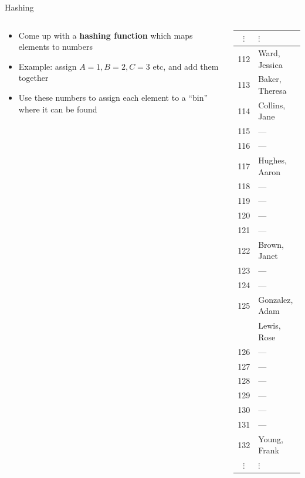 \begin{frame}{Hashing}
	\begin{columns}
		\begin{column}{0.66\textwidth}
			\begin{itemize}
				\item Come up with a \textbf{hashing function} which maps elements to numbers \pause
				\item Example: assign $A=1, B=2, C=3$ etc, and add them together \pause
				\item Use these numbers to assign each element to a ``bin'' where it can be found \pause
			\end{itemize}
		\end{column}
		\begin{column}{0.3\textwidth}
			{\tiny
			\begin{tabular}{|c|l|}
$\vdots$ & $\vdots$ \\\hline
112 & Ward, Jessica \\\hline
113 & Baker, Theresa \\\hline
114 & Collins, Jane \\\hline
115 & --- \\\hline
116 & --- \\\hline
117 & Hughes, Aaron \\\hline
118 & --- \\\hline
119 & --- \\\hline
120 & --- \\\hline
121 & --- \\\hline
122 & Brown, Janet \\\hline
123 & --- \\\hline
124 & --- \\\hline
125 & Gonzalez, Adam \\ & Lewis, Rose \\\hline
126 & --- \\\hline
127 & --- \\\hline
128 & --- \\\hline
129 & --- \\\hline
130 & --- \\\hline
131 & --- \\\hline
132 & Young, Frank \\\hline
$\vdots$ & $\vdots$
			\end{tabular}
			}
		\end{column}
	\end{columns}
\end{frame}

